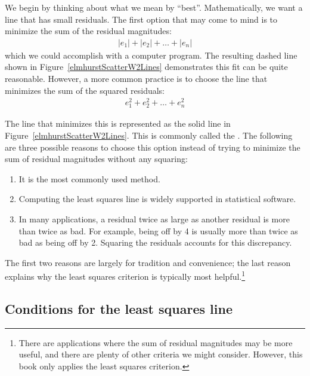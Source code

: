 We begin by thinking about what we mean by ``best''.
Mathematically, we want a line that has small residuals.
The first option that may come to mind is to minimize the
sum of the residual magnitudes:
\begin{align*}
|e_1| + |e_2| + \dots + |e_n|
\end{align*}
which we could accomplish with a computer program.
The resulting dashed line shown in
Figure~\ref{elmhurstScatterW2Lines}
demonstrates this fit can be quite reasonable.
However, a more common practice is to choose the line that
minimizes the sum of the squared residuals:
\begin{align*}
e_{1}^2 + e_{2}^2 + \dots + e_{n}^2
\end{align*}


The line that minimizes this 
is represented as the solid line in
Figure~\ref{elmhurstScatterW2Lines}.
This is commonly called the .
The following are three possible reasons to choose this option
instead of trying to minimize the sum of residual magnitudes
without any squaring:
\begin{enumerate}
\item
    It is the most commonly used method.
\item
    Computing the least squares line is widely supported
    in statistical software.
\item
    In many applications, a residual twice as large
    as another residual is more than twice as bad.
    For example, being off by 4 is usually more than twice
    as bad as being off by 2.
    Squaring the residuals accounts for this discrepancy.
\end{enumerate}
The first two reasons are largely for tradition and convenience;
the last reason explains why the least squares criterion
is typically most helpful.\footnote{There
  are applications where the sum of residual magnitudes
  may be more useful, and there are plenty of other criteria
  we might consider.
  However, this book only applies the least squares criterion.}


\subsection{Conditions for the least squares line}

